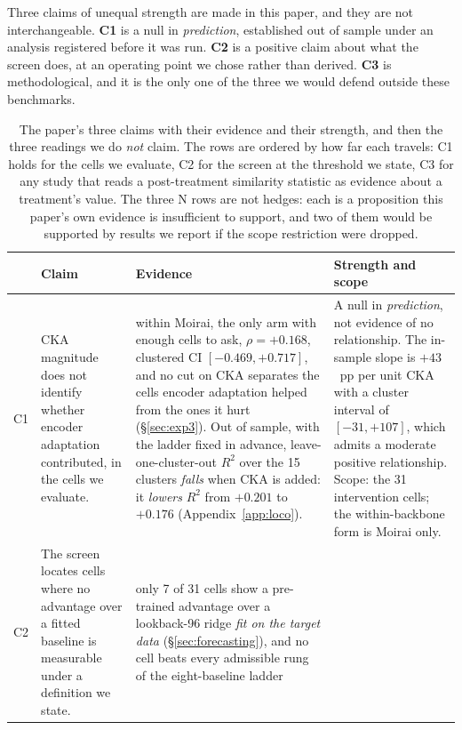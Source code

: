 Three claims of unequal strength are made in this paper, and they are not
interchangeable.  \textbf{C1} is a null in \emph{prediction}, established out of
sample under an analysis registered before it was run.  \textbf{C2} is a positive
claim about what the screen does, at an operating point we chose rather than
derived.  \textbf{C3} is methodological, and it is the only one of the three we
would defend outside these benchmarks.

\begin{table}[!htbp]
\centering\small
\caption{The paper's three claims with their evidence and their strength, and then
the three readings we do \emph{not} claim.  The rows are ordered by how far each
travels: C1 holds for the cells we evaluate, C2 for the screen at the threshold we
state, C3 for any study that reads a post-treatment similarity statistic as
evidence about a treatment's value.  The three N rows are not hedges: each is a
proposition this paper's own evidence is insufficient to support, and two of them
would be supported by results we report if the scope restriction were dropped.}
\label{tab:claims}
\begin{tabular}{@{}p{}p{}p{}p{}@{}}
\toprule
& Claim & Evidence & Strength and scope \\
\midrule
C1 & CKA magnitude does not identify whether encoder adaptation
     contributed, in the cells we evaluate.
   & within Moirai, the only arm with enough cells to ask, $\rho{=}{+}0.168$,
     clustered CI $[-0.469,{+}0.717]$, and no cut on CKA separates the cells
     encoder adaptation helped from the ones it hurt
     (\S\ref{sec:exp3}).  Out of sample, with the ladder fixed in advance,
     leave-one-cluster-out $R^2$ over the 15 clusters \emph{falls} when CKA is
     added: it \emph{lowers} $R^2$ from $+0.201$ to $+0.176$
     (Appendix~\ref{app:loco}).
   & A null in \emph{prediction}, not evidence of no relationship.  The
     in-sample slope is $+43$~pp per unit CKA with a cluster interval of
     $[-31, +107]$, which admits a moderate positive relationship.  Scope: the 31
     intervention cells; the within-backbone form is Moirai only. \\
\addlinespace
C2 & The screen locates cells where no advantage over a fitted baseline is
     measurable under a definition we state.
   & only 7 of 31 cells show a pre-trained advantage over a lookback-96 ridge
     \emph{fit on the target data} (\S\ref{sec:forecasting}), and no cell beats
     every admissible rung of the eight-baseline ladder

\end{tabular}
\end{table}

